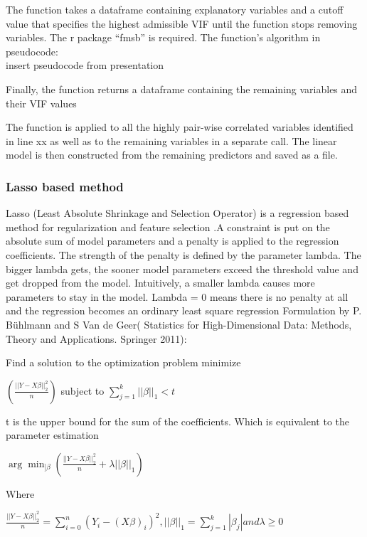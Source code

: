\documentclass[12pt,a4paper,english]{article}
\begin{document}
The function takes a dataframe containing explanatory variables and a cutoff value that specifies the highest admissible VIF until the function stops removing variables. The r package “fmsb” is required.
The function’s algorithm in pseudocode:\\
insert pseudocode from presentation

Finally, the function returns a dataframe containing the remaining variables and their VIF values

The function is applied to all the highly pair-wise correlated variables identified in line xx as well as to the remaining variables in a separate call. The linear model is then constructed from the remaining predictors and saved as a file.

\subsubsection{Lasso based method}

Lasso (Least Absolute Shrinkage and Selection Operator) is a regression based method for regularization and feature selection .A constraint is put on the absolute sum of model parameters and a penalty is applied to the regression coefficients. The strength of the penalty is defined by the parameter lambda. The bigger lambda gets, the sooner model parameters exceed the threshold value and get dropped from the model. Intuitively, a smaller lambda causes more parameters to stay in the model. Lambda = 0 means there is no penalty at all and the regression becomes an ordinary least square regression
Formulation by P. Bühlmann and S Van de Geer(
Statistics for High-Dimensional Data:
Methods, Theory and Applications.
Springer 2011):

Find a solution to the optimization problem 
minimize \\ 
\begin{center}  $\left ( \frac{||Y-X\beta ||^2_2}{n} \right )$ subject to  $\sum_{j=1}^{k} ||\beta ||_1<t$ \end{center} 

t is the upper bound for the sum of the coefficients.
Which is equivalent to the parameter estimation \\ 
\begin{center}  $\arg \min_{]\beta}\left (\frac{||Y-X\beta||_{2}^2}{n} +\lambda ||\beta ||_{1} \right ) $ \end{center} 

Where\\
\begin{center} $\frac{||Y-X\beta||_{2}^2}{n} = \sum _{i=0}^n\left ( Y_{i}-(X\beta)_{i} \right )^2, ||\beta||_{1}=\sum _{j=1}^k|\beta_{j}| and \lambda \geq 0 $\end{center} 
\end{document}
